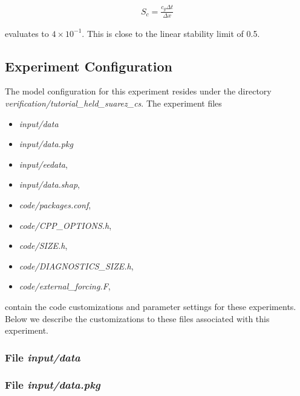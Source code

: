 \begin{eqnarray}
\label{EQ:eg-hs-gfl_stability}
S_{c} = \frac{c_{g} \Delta t}{ \Delta x}
\end{eqnarray}

\noindent evaluates to $4 \times 10^{-1}$. This is close to the linear
stability limit of 0.5.
  
\subsection{Experiment Configuration}
\label{www:tutorials}
\label{SEC:eg-hs_examp_exp_config}

The model configuration for this experiment resides under the 
directory {\it verification/tutorial\_held\_suarez\_cs}.  The experiment files 
\begin{itemize}
\item {\it input/data}
\item {\it input/data.pkg}
\item {\it input/eedata},
\item {\it input/data.shap},
\item {\it code/packages.conf},
\item {\it code/CPP\_OPTIONS.h},
\item {\it code/SIZE.h},
\item {\it code/DIAGNOSTICS\_SIZE.h},
\item {\it code/external\_forcing.F},
\end{itemize}
contain the code customizations and parameter settings for these
experiments. Below we describe the customizations
to these files associated with this experiment.

\subsubsection{File {\it input/data}}
\label{www:tutorials}



\begin{small}

\end{small}

\subsubsection{File {\it input/data.pkg}}
\label{www:tutorials}



